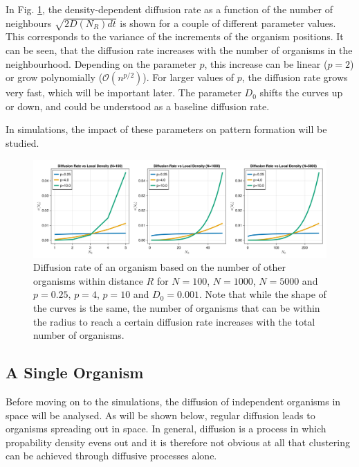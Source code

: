 \documentclass{article}
\begin{document}
In Fig. \ref{diffusion_rates}, the density-dependent diffusion rate as a function of the number of neighbours $\sqrt{2D(N_R) dt}$ is shown for a couple of different parameter values. 
This corresponds to the variance of the increments of the organism positions.
It can be seen, that the diffusion rate increases with the number of organisms in the neighbourhood.
Depending on the parameter $p$, this increase can be linear ($p=2$) or grow polynomially ($\mathcal{O}(n^{p/2})$). 
For larger values of $p$, the diffusion rate grows very fast, which will be important later.
The parameter $D_0$ shifts the curves up or down, and could be understood as a baseline diffusion rate.

In simulations, the impact of these parameters on pattern formation will be studied.

\begin{figure}
    \centering
    \includegraphics[width=1.0\linewidth]{img/diffusion_rates.png}
    \caption{Diffusion rate of an organism based on the number of other organisms within distance $R$ for $N=100$, $N=1000$, $N=5000$ and $p=0.25$, $p=4$, $p=10$ and $D_0 = 0.001$. Note that while the shape of the curves is the same, the number of organisms that can be within the radius to reach a certain diffusion rate increases with the total number of organisms.}
    \label{diffusion_rates} 
\end{figure}

\subsection{A Single Organism}
Before moving on to the simulations, the diffusion of independent organisms in space will be analysed.
As will be shown below, regular diffusion leads to organisms spreading out in space.
In general, diffusion is a process in which propability density evens out and it is therefore not obvious at all that clustering can be achieved through diffusive processes alone.
\end{document}
